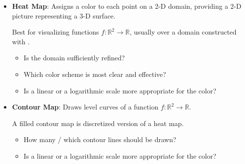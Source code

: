 {\begin{itemize}
Best for visualizing a single unordered array, such as draws from a probability distribution.
%
\begin{itemize}
    \item How many bins should be used?
    \item Over what range should the bins be?
    \item Is a linear or a logarithmic scale more appropriate for the frequency axis?
\end{itemize}

\item \textbf{Heat Map}: Assigns a color to each point on a 2-D domain, providing a 2-D picture representing a 3-D surface.

Best for visualizing functions $f:\mathbb{R}^2\rightarrow\mathbb{R}$, usually over a domain constructed with .
%
\begin{itemize}
    \item Is the domain sufficiently refined?
    \item Which color scheme is most clear and effective?
    \item Is a linear or a logarithmic scale more appropriate for the color?
\end{itemize}

\item \textbf{Contour Map}: Draws level curves of a function $f:\mathbb{R}^2\rightarrow\mathbb{R}$.

A filled contour map is discretized version of a heat map.
%
\begin{itemize}
    \item How many / which contour lines should be drawn?
    \item Is a linear or a logarithmic scale more appropriate for the color?
\end{itemize}

\end{itemize}}
